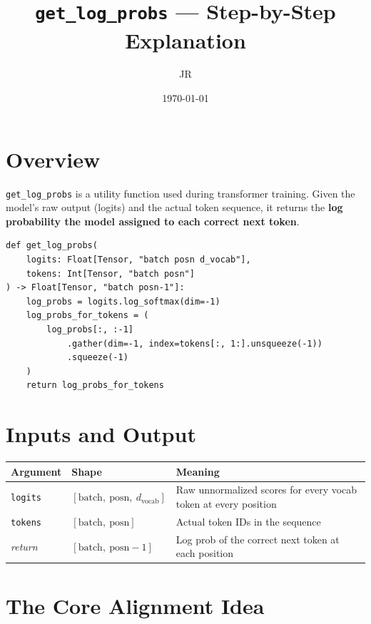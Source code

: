 \documentclass[10pt]{article}
\title{\texttt{get\_log\_probs} --- Step-by-Step Explanation}
\author{JR}
\date{\today}
\begin{document}
\maketitle
\tableofcontents
\newpage

\section{Overview}

\texttt{get\_log\_probs} is a utility function used during transformer training.
Given the model's raw output (logits) and the actual token sequence, it returns
the \textbf{log probability the model assigned to each correct next token}.

\begin{lstlisting}
def get_log_probs(
    logits: Float[Tensor, "batch posn d_vocab"],
    tokens: Int[Tensor, "batch posn"]
) -> Float[Tensor, "batch posn-1"]:
    log_probs = logits.log_softmax(dim=-1)
    log_probs_for_tokens = (
        log_probs[:, :-1]
            .gather(dim=-1, index=tokens[:, 1:].unsqueeze(-1))
            .squeeze(-1)
    )
    return log_probs_for_tokens
\end{lstlisting}

\section{Inputs and Output}

\begin{center}
\begin{tabular}{lll}
\toprule
\textbf{Argument} & \textbf{Shape} & \textbf{Meaning} \\
\midrule
\texttt{logits} & $[\text{batch},\ \text{posn},\ d_\text{vocab}]$ & Raw unnormalized scores for every vocab token at every position \\
\texttt{tokens} & $[\text{batch},\ \text{posn}]$ & Actual token IDs in the sequence \\
\midrule
\textit{return} & $[\text{batch},\ \text{posn}-1]$ & Log prob of the correct next token at each position \\
\bottomrule
\end{tabular}
\end{center}

\section{The Core Alignment Idea}
\end{document}
